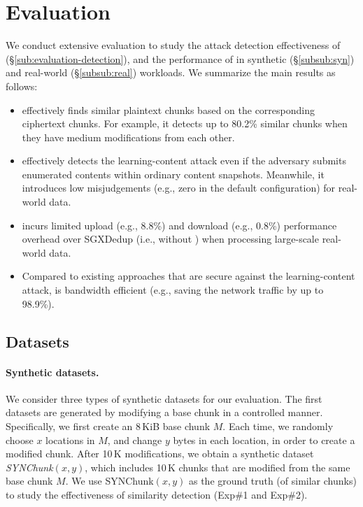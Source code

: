 \section{Evaluation}
\label{sec:evaluation}
We conduct extensive evaluation to study the attack detection effectiveness of \sysnameF (\S\ref{sub:evaluation-detection}), and the performance of \prototype in synthetic (\S\ref{subsub:syn}) and real-world (\S\ref{subsub:real}) workloads. We summarize the main results as follows:
\begin{itemize}[leftmargin=*]
\item \sysnameF effectively finds similar plaintext chunks based on the corresponding ciphertext chunks. For example, it  detects up to 80.2\% similar chunks when they have medium modifications from each other.
\item \sysnameF effectively detects the learning-content attack even if the adversary submits enumerated contents within ordinary content snapshots. Meanwhile, it introduces low misjudgements (e.g., zero in the default configuration) for real-world data.
\item \prototype incurs limited upload (e.g., 8.8\%) and download (e.g., 0.8\%) performance overhead over SGXDedup (i.e., without \sysnameF) when processing large-scale real-world data.
\item Compared to existing approaches \cite{harnik10, li15} that are secure against the learning-content attack, \prototype is bandwidth efficient (e.g., saving the network traffic by up to 98.9\%).
\end{itemize}

\subsection{Datasets}
\label{sub:datasets}


\paragraph{Synthetic datasets.}
We consider three types of synthetic datasets for our evaluation. The first datasets are generated by modifying a base chunk in a controlled manner. Specifically, we first create an 8\,KiB base chunk $M$.  Each time, we randomly choose $x$ locations in $M$, and change $y$ bytes in each location, in order to create a modified chunk. After 10\,K modifications, we obtain a synthetic dataset {\em SYNChunk}$(x, y)$, which includes 10\,K chunks that are modified from the same base chunk $M$. We use SYNChunk$(x, y)$ as the ground truth (of similar chunks) to study the effectiveness of similarity detection (Exp\#1 and Exp\#2).


